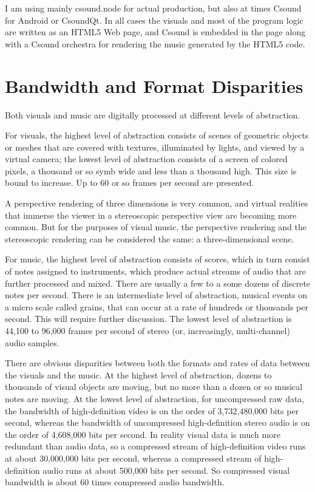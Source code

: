 \documentclass[english,11pt,letterpaper,onecolumn]{scrartcl}
\begin{document}
I am using mainly csound.node for actual production, but also at times Csound 
for Android or CsoundQt. In all cases the visuals and most of the program 
logic are written as an HTML5 Web page, and Csound is embedded in the page 
along with a Csound orchestra for rendering the music generated by the HTML5 
code.

\section{Bandwidth and Format Disparities}

Both visuals and music are digitally processed at different levels of 
abstraction. 

For visuals, the highest level of abstraction consists of scenes 
of geometric objects or meshes that are covered with textures, illuminated by 
lights, and viewed by a virtual camera; the lowest level of abstraction 
consists of a screen of colored pixels, a thousand or so symb
wide and less than a thousand high. This size is bound to increase. Up to 60 
or so frames per second are presented. 

A perspective rendering of three 
dimensions is very common, and virtual realities that immerse the viewer in a 
stereoscopic perspective view are becoming more common. But for the purposes 
of visual music, the perspective rendering and the stereoscopic rendering can 
be considered the same: a three-dimensional scene.

For music, the highest level of abstraction consists of scores, which in turn 
consist of notes assigned to instruments, which produce actual streams of 
audio that are further processed and mixed. There are usually a few to 
a some dozens of discrete notes per second. There is an intermediate level of 
abstraction, musical events on a micro scale called grains, that can occur 
at a rate of hundreds or thousands per second. This will require further 
discussion. The lowest level of abstraction is 44,100 to 
96,000 frames per second of stereo (or, increasingly, multi-channel) audio 
samples.

There are obvious disparities between both the formats and rates of data 
between the visuals and the music. At the highest level of abstraction, dozens 
to thousands of visual objects are moving, but no more than a dozen or so 
musical notes are moving. At the lowest level of abstraction, for uncompressed 
raw data, the bandwidth of high-definition video is on the order of 
3,732,480,000 bits per second, whereas the bandwidth of uncompressed 
high-definition stereo audio is on the order of 4,608,000 bits per second. In 
reality visual data is much more redundant than audio data, so a compressed 
stream of high-definition video runs at about 30,000,000 bits per second, 
whereas a compressed stream of high-definition audio runs at about 500,000 bits 
per second. So compressed visual bandwidth is about 60 times compressed audio 
bandwidth.
\end{document}

